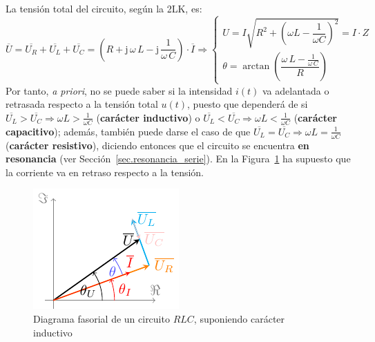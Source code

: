 	La tensión total del circuito, según la 2LK, es: 
	\begin{equation*}
		\overline{U} = \overline{U_R} +\overline{U_L} + \overline{U_C} =\left(R+\mathrm{j}\,\omega\,L - \mathrm{j}\,\dfrac{1}{\omega\,C}\right) \cdot \overline{I}\Rightarrow 
		\begin{cases}
			U=I\sqrt{R^2 + \left(\omega L - \dfrac{1}{\omega C}\right)^2}=I\cdot Z\\
			\theta=\arctan\left( \dfrac{\omega\,L-\frac{1}{\omega\,C}}{R}\right)
		\end{cases}
	\end{equation*}
	Por tanto, \textit{a priori}, no se puede saber si la intensidad $i(t)$ va {adelantada o retrasada} respecto a la tensión total $u(t)$, puesto que dependerá de si $\overline{U_L}>\overline{U_C}\Rightarrow \omega L>\frac{1}{\omega C}$ (\textbf{carácter inductivo}) o $\overline{U_L}<\overline{U_C}\Rightarrow \omega L<\frac{1}{\omega C}$ (\textbf{carácter capacitivo}); además, también puede darse el caso de que $\overline{U_L}=\overline{U_C}\Rightarrow \omega L=\frac{1}{\omega C}$ (\textbf{carácter resistivo}), diciendo entonces que el circuito se encuentra \textbf{en resonancia} (ver Sección~\ref{sec.resonancia_serie}). En la Figura~\ref{fig.fasorRLC_VI} ha supuesto que la corriente va en retraso respecto a la tensión.
	\begin{figure}[H]
		\centering \includegraphics[width=0.3\linewidth]{../figs/fasorRLC_VI.pdf}
		\caption{Diagrama fasorial de un circuito $RLC$, suponiendo carácter inductivo}
		\label{fig.fasorRLC_VI}
	\end{figure}
	
	
	
